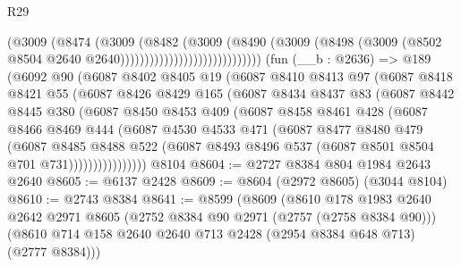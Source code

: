 \begin{lexlean}{R29}
\begin{coremodule}
                                          (@3009
                                            (@8474
                                              (@3009
                                                (@8482
                                                  (@3009
                                                    (@8490
                                                      (@3009
                                                        (@8498
                                                          (@3009
                                                            (@8502
                                                              @8504
                                                              @2640
                                                              @2640)))))))))))))))))))))))))))))
    (fun (__b : @2636) =>
    @189
      (@6092
        @90
        (@6087
          @8402
          @8405
          @19
          (@6087
            @8410
            @8413
            @97
            (@6087
              @8418
              @8421
              @55
              (@6087
                @8426
                @8429
                @165
                (@6087
                  @8434
                  @8437
                  @83
                  (@6087
                    @8442
                    @8445
                    @380
                    (@6087
                      @8450
                      @8453
                      @409
                      (@6087
                        @8458
                        @8461
                        @428
                        (@6087
                          @8466
                          @8469
                          @444
                          (@6087
                            @4530
                            @4533
                            @471
                            (@6087
                              @8477
                              @8480
                              @479
                              (@6087
                                @8485
                                @8488
                                @522
                                (@6087 @8493 @8496 @537 (@6087 @8501 @8504 @701 @731))))))))))))))))
    @8104
@8604 := @2727 @8384 @804 @1984 @2643 @2640
@8605 := @6137 @2428
@8609 := @8604 (@2972 @8605) (@3044 @8104)
@8610 := @2743 @8384
@8641 := @8599
    (@8609
      (@8610
        @178
        @1983
        @2640
        @2642
        @2971
        @8605
        (@2752 @8384 @90 @2971 (@2757 (@2758 @8384 @90)))
        (@8610 @714 @158 @2640 @2640 @713 @2428 (@2954 @8384 @648 @713) (@2777 @8384)))

\end{coremodule}
\end{lexlean}
